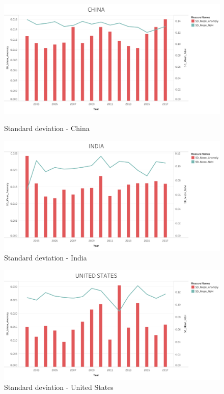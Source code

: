 \begin{itemize}
     \begin{figure}[!htb]
        \begin{minipage}{0.5\textwidth}
            \centering
            \includegraphics[width=1.0\linewidth]{figures/ch5/StandardDeviation/CHINA_SD.png}
            \caption{Standard deviation - China}\label{Fig:CHINA_SD}
        \end{minipage}\hfill
        \begin{minipage}{0.5\textwidth}
            \centering
            \includegraphics[width=1.0\linewidth]{figures/ch5/StandardDeviation/INDIA_SD.png}
            \caption{Standard deviation - India}\label{Fig:INDIA_SD}
        \end{minipage}
    \end{figure}
    
     \begin{figure}[H]
            \centering
            \includegraphics[width=0.5\linewidth]{figures/ch5/StandardDeviation/US_SD.png}
            \caption{\label{fig:US_SD}Standard deviation - United States}
    \end{figure}
    

\end{itemize}
